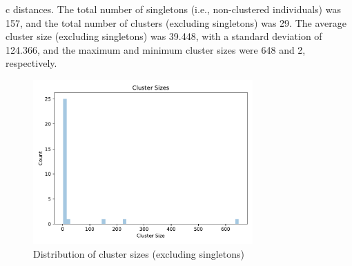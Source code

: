\documentclass{article}
\begin{document}
c distances. The total number of singletons (i.e., non-clustered individuals) was 157, and the total number of clusters (excluding singletons) was 29. The average cluster size (excluding singletons) was 39.448, with a standard deviation of 124.366, and the maximum and minimum cluster sizes were 648 and 2, respectively.

\begin{figure}[h]
\centering
\includegraphics[width=0.75\textwidth,keepaspectratio]{./figs/cluster_sizes.pdf}
\caption{Distribution of cluster sizes (excluding singletons)}
\end{figure}
\end{document}
